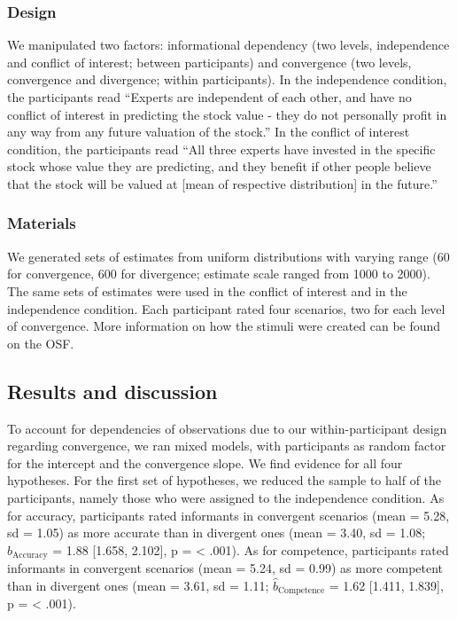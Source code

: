 \documentclass[
  doc,floatsintext]{apa6}
\begin{document}
\hypertarget{design}{%
\subsubsection{Design}\label{design}}

We manipulated two factors: informational dependency (two levels, independence and conflict of interest; between participants) and convergence (two levels, convergence and divergence; within participants). In the independence condition, the participants read ``Experts are independent of each other, and have no conflict of interest in predicting the stock value - they do not personally profit in any way from any future valuation of the stock.'' In the conflict of interest condition, the participants read ``All three experts have invested in the specific stock whose value they are predicting, and they benefit if other people believe that the stock will be valued at {[}mean of respective distribution{]} in the future.''

\hypertarget{materials}{%
\subsubsection{Materials}\label{materials}}

We generated sets of estimates from uniform distributions with varying range (60 for convergence, 600 for divergence; estimate scale ranged from 1000 to 2000). The same sets of estimates were used in the conflict of interest and in the independence condition. Each participant rated four scenarios, two for each level of convergence. More information on how the stimuli were created can be found on the OSF.

\hypertarget{results-and-discussion}{%
\subsection{Results and discussion}\label{results-and-discussion}}

To account for dependencies of observations due to our within-participant design regarding convergence, we ran mixed models, with participants as random factor for the intercept and the convergence slope. We find evidence for all four hypotheses. For the first set of hypotheses, we reduced the sample to half of the participants, namely those who were assigned to the independence condition. As for accuracy, participants rated informants in convergent scenarios (mean = 5.28, sd = 1.05) as more accurate than in divergent ones (mean = 3.40, sd = 1.08; \(\hat{b}_{\text{Accuracy}}\) = 1.88 {[}1.658, 2.102{]}, p = \textless{} .001). As for competence, participants rated informants in convergent scenarios (mean = 5.24, sd = 0.99) as more competent than in divergent ones (mean = 3.61, sd = 1.11; \(\hat{b}_{\text{Competence}}\) = 1.62 {[}1.411, 1.839{]}, p = \textless{} .001).
\end{document}
